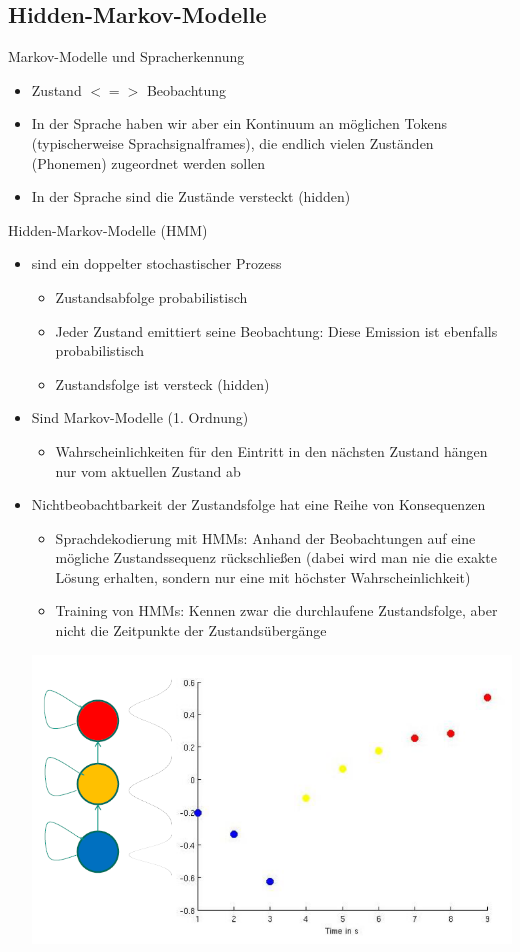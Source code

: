 \documentclass[a4paper,10pt,oneside]{article}
\begin{document}
\subsection{Hidden-Markov-Modelle}
Markov-Modelle und Spracherkennung
	\begin{itemize}
		\item Zustand $<=>$ Beobachtung
		\item In der Sprache haben wir aber ein Kontinuum an möglichen Tokens (typischerweise Sprachsignalframes), die endlich vielen Zuständen (Phonemen) zugeordnet werden sollen
		\item In der Sprache sind die Zustände versteckt (hidden)
	\end{itemize}
	
Hidden-Markov-Modelle (HMM) 
	\begin{itemize}
		\item sind ein doppelter stochastischer Prozess
			\begin{itemize}
				\item Zustandsabfolge probabilistisch
				\item Jeder Zustand emittiert seine Beobachtung: Diese Emission ist ebenfalls probabilistisch
				\item Zustandsfolge ist versteck (hidden)
			\end{itemize}
		\item Sind Markov-Modelle (1. Ordnung)
			\begin{itemize}
				\item Wahrscheinlichkeiten für den Eintritt in den nächsten Zustand hängen nur vom aktuellen Zustand ab
			\end{itemize}
		\item Nichtbeobachtbarkeit der Zustandsfolge hat eine Reihe von Konsequenzen		
			\begin{itemize}
				\item Sprachdekodierung mit HMMs: Anhand der Beobachtungen auf eine mögliche Zustandssequenz rückschließen (dabei wird man nie die exakte Lösung erhalten, sondern nur eine mit höchster Wahrscheinlichkeit)
				\item Training von HMMs: Kennen zwar die durchlaufene Zustandsfolge, aber nicht die Zeitpunkte der Zustandsübergänge
			\end{itemize}
			\centering 
			\includegraphics[scale=0.5]{Grafiken/hmm-darstellung.png}
	\end{itemize}
\end{document}
